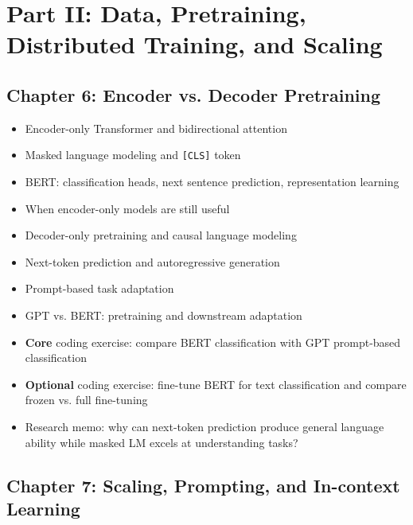 \documentclass[11pt]{article}
\begin{document}
\section{Part II: Data, Pretraining, Distributed Training, and Scaling}

\subsection{Chapter 6: Encoder vs. Decoder Pretraining}

\begin{itemize}
    \item Encoder-only Transformer and bidirectional attention
    \item Masked language modeling and \texttt{[CLS]} token
    \item BERT: classification heads, next sentence prediction, representation learning
    \item When encoder-only models are still useful
    \item Decoder-only pretraining and causal language modeling
    \item Next-token prediction and autoregressive generation
    \item Prompt-based task adaptation
    \item GPT vs. BERT: pretraining and downstream adaptation
    \item \textbf{Core} coding exercise: compare BERT classification with GPT prompt-based classification
    \item \textbf{Optional} coding exercise: fine-tune BERT for text classification and compare frozen vs. full fine-tuning
    \item Research memo: why can next-token prediction produce general language ability while masked LM excels at understanding tasks?
\end{itemize}

\subsection{Chapter 7: Scaling, Prompting, and In-context Learning}
\end{document}

